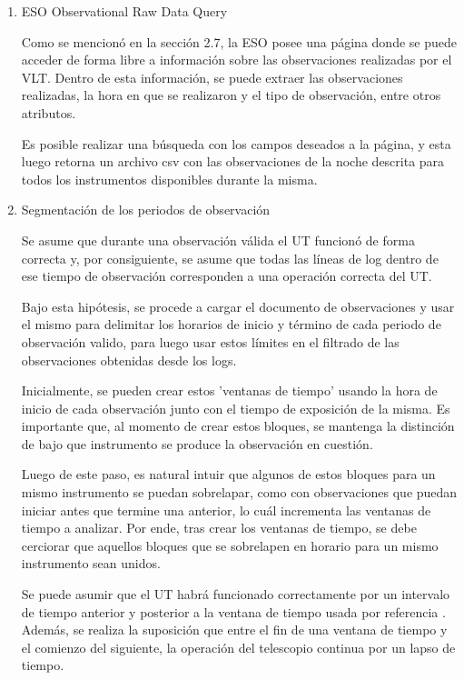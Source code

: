 \begin{enumerate}

    \item{ESO Observational Raw Data Query}
    
    Como se mencionó en la sección 2.7, la ESO posee una página donde se puede acceder de forma libre a información sobre las observaciones realizadas por el VLT. Dentro de esta información, se puede extraer las observaciones realizadas, la hora en que se realizaron y el tipo de observación, entre otros atributos.
    
    Es posible realizar una búsqueda con los campos deseados a la página, y esta luego retorna un archivo csv con las observaciones de la noche descrita para todos los instrumentos disponibles durante la misma.

    \item{Segmentación de los periodos de observación}

    Se asume que durante una observación válida el UT funcionó de forma correcta y, por consiguiente, se asume que todas las líneas de log dentro de ese tiempo de observación corresponden a una operación correcta del UT.

    Bajo esta hipótesis, se procede a cargar el documento de observaciones y usar el mismo para delimitar los horarios de inicio y término de cada periodo de observación valido, para luego usar estos límites en el filtrado de las observaciones obtenidas desde los logs.

    Inicialmente, se pueden crear estos 'ventanas de tiempo' usando la hora de inicio de cada observación junto con el tiempo de exposición de la misma. Es importante que, al momento de crear estos bloques, se mantenga la distinción de bajo que instrumento se produce la observación en cuestión.

    Luego de este paso, es natural intuir que algunos de estos bloques para un mismo instrumento se puedan sobrelapar, como con observaciones que puedan iniciar antes que termine una anterior, lo cuál incrementa las ventanas de tiempo a analizar. Por ende, tras crear los ventanas de tiempo, se debe cerciorar que aquellos bloques que se sobrelapen en horario para un mismo instrumento sean unidos.

    Se puede asumir que el UT habrá funcionado correctamente por un intervalo de tiempo anterior y posterior a la ventana de tiempo usada por referencia \cite{eso1998vlt}. Además, se realiza la suposición que entre el fin de una ventana de tiempo y el comienzo del siguiente, la operación del telescopio continua por un lapso de tiempo.
    

\end{enumerate}
